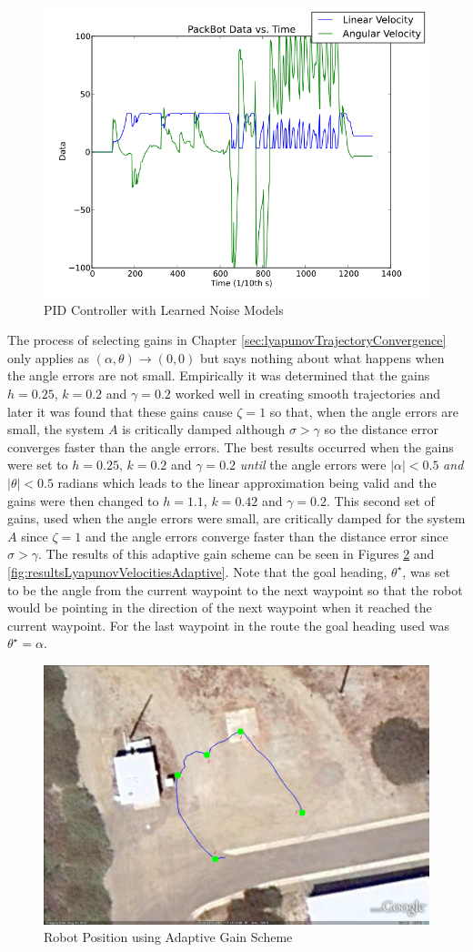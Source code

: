 \begin{figure}[ht!]
	\centering
	\includegraphics[width=.5\textwidth]{images/pbtx/20101203_1751_pbtxPidNewQR}
	\caption{PID Controller with Learned Noise Models}
	\label{fig:resultsLyapunov4}
\end{figure}

The process of selecting gains in Chapter \ref{sec:lyapunovTrajectoryConvergence} only applies as $(\alpha, \theta)\to(0,0)$ but says nothing about what happens when the angle errors are not small. Empirically it was determined that the gains $h=0.25$, $k=0.2$ and $\gamma=0.2$ worked well in creating smooth trajectories and later it was found that these gains cause $\zeta=1$ so that, when the angle errors are small, the system $A$ is critically damped although $\sigma>\gamma$ so the distance error converges faster than the angle errors. The best results occurred when the gains were set to $h=0.25$, $k=0.2$ and $\gamma=0.2$ \textit{until} the angle errors were $|\alpha|<0.5$ \textit{and} $|\theta|<0.5$ radians which leads to the linear approximation being valid and the gains were then changed to $h=1.1$, $k=0.42$ and $\gamma=0.2$. This second set of gains, used when the angle errors were small, are critically damped for the system $A$ since $\zeta=1$ and the angle errors converge faster than the distance error since $\sigma>\gamma$. The results of this adaptive gain scheme can be seen in Figures \ref{fig:resultsLyapunovPositionAdaptive} and \ref{fig:resultsLyapunovVelocitiesAdaptive}. Note that the goal heading, $\theta^\star$, was set to be the angle from the current waypoint to the next waypoint so that the robot would be pointing in the direction of the next waypoint when it reached the current waypoint. For the last waypoint in the route the goal heading used was $\theta^\star=\alpha$.

\begin{figure}[ht!]
	\centering
	\includegraphics[width=.5\textwidth]{images/GE/20100929_1448_GE_KF_waypts}
	\caption{Robot Position using Adaptive Gain Scheme}
	\label{fig:resultsLyapunovPositionAdaptive}
\end{figure}

